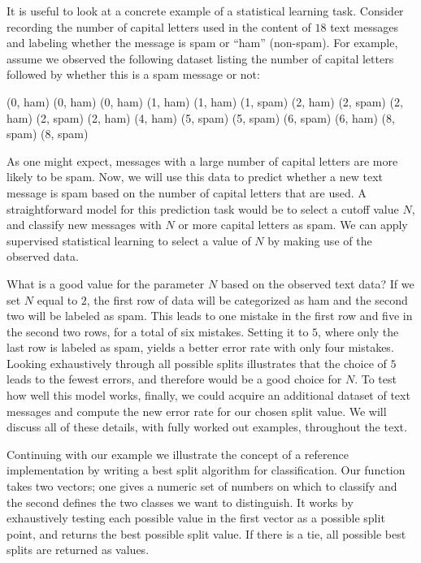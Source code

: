 \documentclass[12pt,hidelinks]{article}
\numberwithin{equation}{section}
\begin{document}
It is useful to look at a concrete example of a statistical learning task.
Consider recording the number of capital letters used in the content of $18$
text messages and labeling whether the message is spam or ``ham'' (non-spam).
For example, assume we observed the following dataset listing the number of
capital letters followed by whether this is a spam message or not:
\begin{rcode} %
(0, ham)  (0, ham)   (0, ham)  (1, ham)   (1, ham)  (1, spam)
(2, ham)  (2, spam)  (2, ham)  (2, spam)  (2, ham)  (4, ham)
(5, spam) (5, spam)  (6, spam) (6, ham)   (8, spam) (8, spam)
\end{rcode} %
As one might expect, messages with a large number of capital letters are more
likely to be spam. Now, we will use this data to predict whether a new text
message is spam based on the number of capital letters that are used. A
straightforward model for this prediction
task would be to select a cutoff value $N$, and classify new messages with
$N$ or more capital letters as spam. We can apply supervised statistical
learning to select a value of $N$ by making use of the observed data.

What is a good value for the parameter $N$ based on the observed text data?
If we set $N$ equal to $2$, the first row of data will be categorized as ham
and the second two will be labeled as spam. This leads to one mistake in the
first row and five in the second two rows, for a total of six mistakes.
Setting it to $5$, where only the last row is labeled as spam, yields a better
error rate with only four mistakes. Looking exhaustively through all possible
splits illustrates that the choice of $5$ leads to the fewest errors, and
therefore would be a good choice for $N$. To test how well this model works,
finally, we could acquire an additional dataset of text messages and compute
the new error rate for our chosen split value. We will discuss all of these
details, with fully worked out examples, throughout the text.

Continuing with our example we
illustrate the concept of a reference implementation by writing a best split
algorithm for classification. Our function takes two vectors; one gives a
numeric set of numbers on which to classify and the second defines the two
classes we want to distinguish. It works by exhaustively testing each possible
value in the first vector as a possible split point, and returns the best
possible split value. If there is a tie, all possible best splits are returned
as values.
\end{document}
